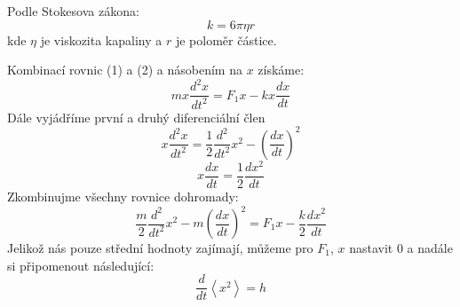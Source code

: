 \documentclass[a4paper,11pt]{article}
\begin{document}
    \begin{minipage}[t]{0.5\textwidth} 
        Podle Stokesova zákona:
        \begin{equation}
            k = 6 \pi \eta r
        \end{equation}
        kde $\eta$ je viskozita kapaliny a $r$ je poloměr částice.
        \par Kombinací rovnic (1) a (2) a násobením na $x$ získáme: 
        \begin{equation}
            mx \frac{d^2x}{dt^2} = F_1x -kx \frac{dx}{dt}
        \end{equation}
        Dále vyjádříme první a druhý diferenciální člen
        \begin{equation}
           x \frac{d^2x}{dt^2} = \frac{1}{2} \frac{d^2}{dt^2} x^2 - \left(\frac{dx}{dt}\right)^2
        \end{equation}
        \begin{equation}
          x \frac{dx}{dt} = \frac{1}{2} \frac{dx^2}{dt}
        \end{equation}
        Zkombinujme všechny rovnice dohromady:
        \begin{equation}
          \frac{m}{2} \frac{d^2}{dt^2} x^2 - m\left(\frac{dx}{dt}\right)^2 = F_1 x - \frac{k}{2} \frac{dx^2}{dt}
        \end{equation}
        Jelikož nás pouze střední hodnoty zajímají, můžeme pro $F_1$, $x$ nastavit 0 a nadále si připomenout následující:
        \begin{equation}
            \frac{d}{dt}\left\langle x^2 \right\rangle = h
        \end{equation}
    \end{minipage}
    \newpage
\end{document}
